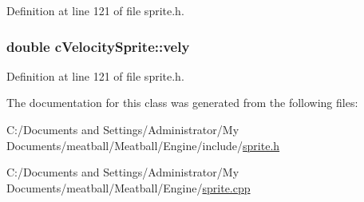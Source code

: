 Definition at line 121 of file sprite.\-h.

\hypertarget{classc_velocity_sprite_a38b6e47912f9b5a385e90e5192850936}{
\subsubsection[{vely}]{\setlength{\rightskip}{0pt plus 5cm}double c\-Velocity\-Sprite\-::vely}}\label{classc_velocity_sprite_a38b6e47912f9b5a385e90e5192850936}


Definition at line 121 of file sprite.\-h.



The documentation for this class was generated from the following files\-:\begin{DoxyCompactItemize}
\item 
C\-:/\-Documents and Settings/\-Administrator/\-My Documents/meatball/\-Meatball/\-Engine/include/\hyperlink{_engine_2include_2sprite_8h}{sprite.\-h}\item 
C\-:/\-Documents and Settings/\-Administrator/\-My Documents/meatball/\-Meatball/\-Engine/\hyperlink{_engine_2sprite_8cpp}{sprite.\-cpp}\end{DoxyCompactItemize}
